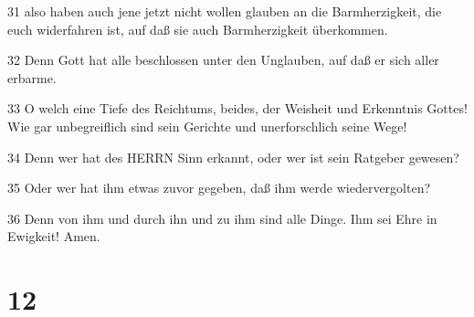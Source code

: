 \par 31 also haben auch jene jetzt nicht wollen glauben an die Barmherzigkeit, die euch widerfahren ist, auf daß sie auch Barmherzigkeit überkommen.
\par 32 Denn Gott hat alle beschlossen unter den Unglauben, auf daß er sich aller erbarme.
\par 33 O welch eine Tiefe des Reichtums, beides, der Weisheit und Erkenntnis Gottes! Wie gar unbegreiflich sind sein Gerichte und unerforschlich seine Wege!
\par 34 Denn wer hat des HERRN Sinn erkannt, oder wer ist sein Ratgeber gewesen?
\par 35 Oder wer hat ihm etwas zuvor gegeben, daß ihm werde wiedervergolten?
\par 36 Denn von ihm und durch ihn und zu ihm sind alle Dinge. Ihm sei Ehre in Ewigkeit! Amen.

\chapter{12}

